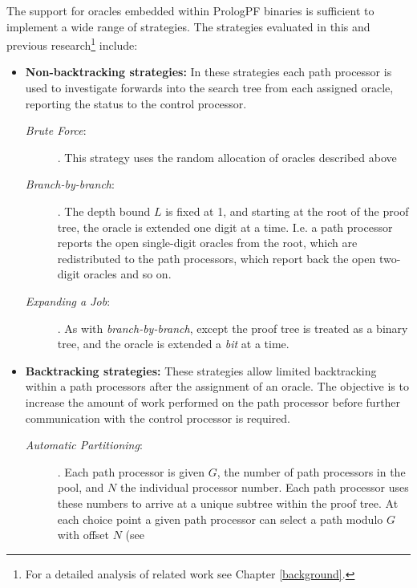 The support for oracles embedded within PrologPF binaries is sufficient to
implement a wide range of strategies.  The strategies evaluated in this and
previous research\footnote{For a detailed analysis of related work
see Chapter \ref{background}.} include:

\begin{itemize}
\item{\textbf{Non-backtracking strategies:}
  In these strategies each path processor is used to investigate forwards into
  the search tree from each assigned oracle, reporting the status to the control
  processor.
  \begin{description}
    \item[\textit{Brute Force}:\\]{
       \cite{CA87}.
       This strategy uses the random allocation of oracles described above}
    \item[\textit{Branch-by-branch}:\\]{
      \cite{Kle91}. 
      The depth bound $L$ is fixed at 1, and
      starting at the root of the proof tree, the oracle is extended one digit at
      a time.  I.e. a path processor reports the open single-digit oracles from
      the root, which are redistributed to the path processors, which report back the
      open two-digit oracles and so on.}
    \item[\textit{Expanding a Job}:\\]{
      \cite{CA87}.
      As with \textit{branch-by-branch}, except
      the proof tree is treated as a binary tree, and the oracle is extended a
      \textit{bit} at a time.}
  \end{description}}
\item{\textbf{Backtracking strategies:}
  These strategies allow limited backtracking within a path processors after
  the assignment of an oracle.  The objective is to increase the amount of
  work performed on the path processor before further communication with the
  control processor is required.
  \begin{description}
    \item[\textit{Automatic Partitioning}:\\]{
      \cite{Kle91}.
      Each path processor is given $G$, the number of path processors in the pool,
      and $N$ the individual processor number.  Each path processor uses these numbers to
      arrive at a unique subtree within the proof tree.  At each choice point a
      given path processor can select a path modulo $G$ with offset $N$ (see 
}
\end{description}}
\end{itemize}
